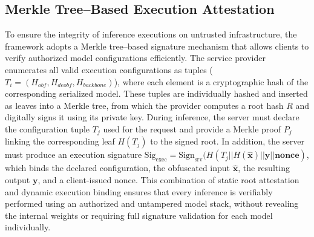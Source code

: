 \documentclass{ieeeaccess}
\begin{document}
\subsection{Merkle Tree–Based Execution Attestation}
To ensure the integrity of inference executions on untrusted infrastructure, the framework adopts a Merkle tree–based signature mechanism that allows clients to verify authorized model configurations efficiently. The service provider enumerates all valid execution configurations as tuples ($T_i = (H_{obf},H_{deobf},H_{backbone})$), where each element is a cryptographic hash of the corresponding serialized model. These tuples are individually hashed and inserted as leaves into a Merkle tree, from which the provider computes a root hash $R$ and digitally signs it using its private key. During inference, the server must declare the configuration tuple $T_j$ used for the request and provide a Merkle proof $P_j$ linking the corresponding leaf $H(T_j)$ to the signed root. In addition, the server must produce an execution signature $\textrm{Sig}_{\text{exec}} = \textrm{Sign}_{\text{srv}}(H(T_j||H(\hat{\textbf{x}})||\textbf{y}||\textbf{nonce})$, which binds the declared configuration, the obfuscated input $\hat{\mathbf{x}}$, the resulting output $\mathbf{y}$, and a client-issued nonce. This combination of static root attestation and dynamic execution binding ensures that every inference is verifiably performed using an authorized and untampered model stack, without revealing the internal weights or requiring full signature validation for each model individually.
\end{document}
